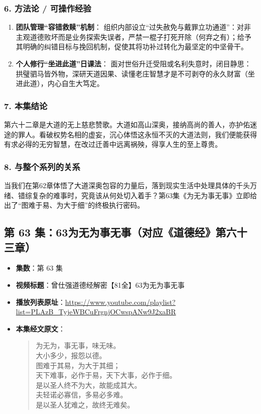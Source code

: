 \subsubsection{6. 方法论 / 可操作经验}
\begin{enumerate}
    \item \textbf{团队管理“容错救赎”机制}：
    组织内部设立“过失赦免与戴罪立功通道”：对非主观道德败坏而是业务探索失误者，严禁一棍子打死开除（何弃之有）；给予其明确的纠错目标与挽回机制，促使其将功补过转化为最坚定的中坚骨干。
    \item \textbf{个人修行“坐进此道”日课法}：
    面对世俗升迁受阻或名利失意时，闭目静思：拱璧驷马皆外物，深研天道因果、读懂老庄智慧才是不可剥夺的永久财富（坐进此道），内心自生大笃定。
\end{enumerate}

\subsubsection{7. 本集结论}
第六十二章是大道的无上慈悲赞歌。大道如高山深奥，接纳高尚的善人，亦护佑迷途的罪人。看破权势名相的虚妄，沉心体悟这永恒不灭的大道法则，我们便能获得有求必得的无穷智慧，在改过迁善中远离祸殃，得享人生的至上尊贵。

\subsubsection{8. 与整个系列的关系}
当我们在第62章体悟了大道深奥包容的力量后，落到现实生活中处理具体的千头万绪、错综复杂的难事时，究竟该从何处切入着手？第63集《为无为事无事》立即给出了“图难于易、为大于细”的终极执行密码。

\clearpage

\subsection{第 63 集：63为无为事无事（对应《道德经》第六十三章）}
\label{sec:ep63}

\begin{itemize}
    \item \textbf{集数}：第 63 集
    \item \textbf{视频标题}：曾仕强道德经解密【81全】63为无为事无事
    \item \textbf{播放列表原址}：\url{https://www.youtube.com/playlist?list=PLAzB_TyjeWBCuFrgnjOCwspANw9J2xaBR}
    \item \textbf{本集经文原文}：
    \begin{quote}\kaishu
    为无为，事无事，味无味。\\
    大小多少，报怨以德。\\
    图难于其易，为大于其细；\\
    天下难事，必作于易，天下大事，必作于细。\\
    是以圣人终不为大，故能成其大。\\
    夫轻诺必寡信，多易必多难。\\
    是以圣人犹难之，故终无难矣。
    \end{quote}
\end{itemize}

